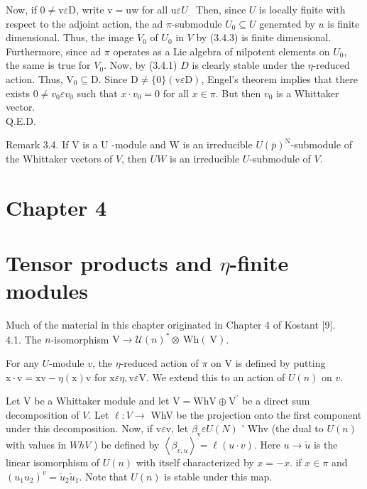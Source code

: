 \documentclass[10pt]{article}
\begin{document}
Now, if $0 \neq \mathrm{v} \varepsilon \mathrm{D}$, write $\mathrm{v}=\mathrm{uw}$ for all $\mathrm{u} \varepsilon U_{\text {. }}$ Then, since $U$ is locally finite with respect to the adjoint action, the ad $\pi$-submodule $U_{0} \subseteq U$ generated by $u$ is finite dimensional. Thus, the image $V_{0}$ of $U_{0}$ in $V$ by (3.4.3) is finite dimensional. Furthermore, since ad $\pi$ operates as a Lie algebra of nilpotent elements on $U_{0}$, the same is true for $V_{0}$. Now, by (3.4.1) $D$ is clearly stable under the $\eta$-reduced action. Thus, $\mathrm{V}_{0} \subseteq \mathrm{D}$. Since $\mathrm{D} \neq\{0\}(\mathrm{v} \varepsilon \mathrm{D})$, Engel's theorem implies that there exists $0 \neq v_{0} \varepsilon v_{0}$ such that $x \cdot v_{0}=0$ for all $x \in \pi$. But then $v_{0}$ is a Whittaker vector.\\
Q.E.D.

Remark 3.4. If V is a U -module and W is an irreducible $U(\bar{p})^{\mathrm{N}}$-submodule of the Whittaker vectors of $V$, then $U W$ is an irreducible $U$-submodule of $V$.

\section{Chapter 4}
\section{Tensor products and $\eta$-finite modules}
Much of the material in this chapter originated in Chapter 4 of Kostant [9].\\
4.1. The $n$-isomorphism $\mathrm{V} \rightarrow \mathcal{U}(n)^{*} \otimes \mathrm{~Wh}(\mathrm{~V})$.

For any $U$-module $v$, the $\eta$-reduced action of $\pi$ on V is defined by putting $\mathrm{x} \cdot \mathrm{v}=\mathrm{xv}-\eta(\mathrm{x}) \mathrm{v}$ for $\mathrm{x} \varepsilon \eta, \mathrm{v} \varepsilon \mathrm{V}$. We extend this to an action of $U(n)$ on $v$.

Let V be a Whittaker module and let $\mathrm{V}=\mathrm{WhV} \oplus \mathrm{V}^{\prime}$ be a direct sum decomposition of $V$. Let $\ell: V \rightarrow$ WhV be the projection onto the first component under this decomposition. Now, if $\mathrm{v} \varepsilon \mathrm{v}$, let $\beta_{\mathrm{v}} \varepsilon U(N)$ ' Whv (the dual to $U(n)$ with values in $W h V$ ) be defined by $\left\langle\beta_{v, u}\right\rangle=\ell(u \cdot v)$. Here $u \rightarrow \check{u}$ is the linear isomorphism of $U(n)$ with itself characterized by $x=-x$. if $x \in \pi$ and $\left(u_{1} u_{2}\right)^{v}=\check{u}_{2} \check{u}_{1}$. Note that $U(n)$ is stable under this map.
\end{document}
